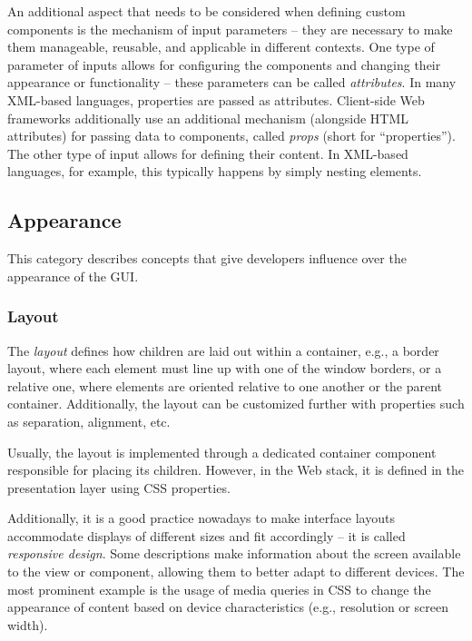 An additional aspect that needs to be considered when defining custom components is the mechanism of input parameters -- they are necessary to make them manageable, reusable, and applicable in different contexts.
One type of parameter of inputs allows for configuring the components and changing their appearance or functionality -- these parameters can be called \emph{attributes}.
In many XML-based languages, properties are passed as attributes.
Client-side Web frameworks additionally use an additional mechanism (alongside HTML attributes) for passing data to components, called \emph{props} (short for \enquote{properties}).
The other type of input allows for defining their content.
In XML-based languages, for example, this typically happens by simply nesting elements.

\subsection{Appearance}\label{subsec:appearance}
This category describes concepts that give developers influence over the appearance of the GUI\@.

\subsubsection{Layout}
The \emph{layout} defines how children are laid out within a container, e.g., a border layout, where each element must line up with one of the window borders, or a relative one, where elements are oriented relative to one another or the parent container.
Additionally, the layout can be customized further with properties such as separation, alignment, etc.

Usually, the layout is implemented through a dedicated container component responsible for placing its children.
However, in the Web stack, it is defined in the presentation layer using CSS properties.

Additionally, it is a good practice nowadays to make interface layouts accommodate displays of different sizes and fit accordingly -- it is called \emph{responsive design}.
Some descriptions make information about the screen available to the view or component, allowing them to better adapt to different devices.
The most prominent example is the usage of media queries in CSS to change the appearance of content based on device characteristics (e.g., resolution or screen width).

